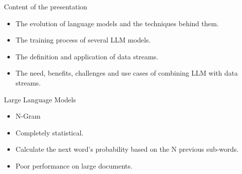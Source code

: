 \documentclass[t]{beamer}
\begin{document}
\begin{frame}{Content of the presentation}
  \begin{itemize}
    \item The evolution of language models and the techniques behind them.
    \item The training process of several LLM models.
    \item The definition and application of data streams.
    \item The need, benefits, challenges and use cases of combining LLM with data streams.
  \end{itemize}
\end{frame}
\begin{frame}{Large Language Models}
  \vspace{3cm}
  \centering
\vspace{1cm}
\begin{itemize}
  \item N-Gram \cite{Cavnar94}
  \item Completely statistical.
  \item Calculate the next word's probability based on the N previous sub-words.
  \item Poor performance on large documents.
\end{itemize}
\end{frame}
\end{document}
